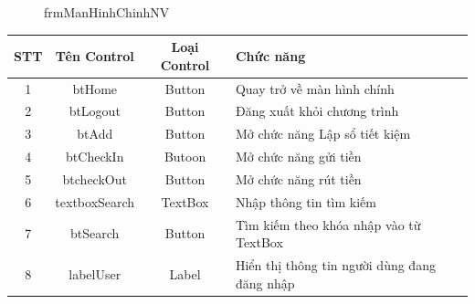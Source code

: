 \documentclass{article}
\begin{document}
\begin{enumerate}
\begin{itemize}
					\begin{figure}[!h]
						\setlength\fboxsep{1pt}
						\setlength\fboxrule{1pt}
						\caption{frmManHinhChinhNV}
						\label{fig:frmManHinhChinhNV}
					\end{figure}
					
					
			
				\begin{center}
						\begin{tabular}{|c|c|c|p{5cm}|}
						
						\hline
						STT & Tên Control & Loại Control & Chức năng \\
						\hline
						1 & btHome & Button & Quay trở về màn hình chính\\
						\hline
						2 & btLogout & Button & Đăng xuất khỏi chương trình \\
						\hline
						3 & btAdd & Button & Mở chức năng Lập sổ tiết kiệm \\
						\hline
						4 & btCheckIn & Butoon & Mở chức năng gửi tiền \\
						\hline
						5 & btcheckOut & Button & Mở chức năng rút tiền \\
						\hline
						6 & textboxSearch & TextBox & Nhập thông tin tìm kiếm \\
						\hline
						7 & btSearch & Button & Tìm kiếm theo khóa nhập vào từ TextBox\\
						\hline
						8 & labelUser & Label & Hiển thị thông tin người dùng đang đăng nhập\\
						\hline
					\end{tabular}
				\end{center}
				

\end{itemize}
\end{enumerate}
\end{document}

